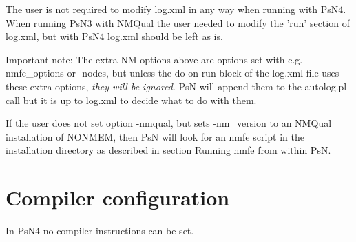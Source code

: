 The user is not required to modify log.xml in any way when running with PsN4.
When running PsN3 with NMQual the user needed to modify the 'run' section of log.xml, but with PsN4 
log.xml should be left as is.

Important note: The extra NM options above are options set with e.g. -nmfe\_options or -nodes, but unless the
do-on-run block of the log.xml file uses these extra options, 
\emph{they will be ignored}. 
PsN will append them to the autolog.pl call but it is up to log.xml to decide what to do with them.

If the user does not set option -nmqual, but sets -nm\_version to an NMQual installation of NONMEM, then PsN will look for an nmfe script in the installation directory
as described in section Running nmfe from within PsN.

\section{Compiler configuration}

In PsN4 no compiler instructions can be set.


